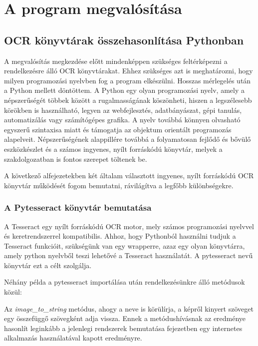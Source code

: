 \documentclass[12pt]{report}
\begin{document}
\chapter{A program megvalósítása}
\section{OCR könyvtárak összehasonlítása Pythonban}

A megvalósítás megkezdése előtt mindenképpen szükséges feltérképezni a rendelkezésre álló OCR könyvtárakat. Ehhez szükséges azt is meghatározni, hogy milyen programozási nyelvben fog a program elkészülni. Hosszas mérlegelés után a Python mellett döntöttem. A Python egy olyan programozási nyelv, amely a népszerűségét többek között a rugalmasságának köszönheti, hiszen a legszélesebb körökben is használható, legyen az webfejlesztés, adatbányászat, gépi tanulás, automatizálás vagy számítógépes grafika. A nyelv továbbá könnyen olvasható egyszerű szintaxisa miatt és támogatja az objektum orientált programozás alapelveit. Népszerűségének alappillére továbbá a folyamatosan fejlődő és bővülő eszközkészlet és a számos ingyenes, nyílt forráskódú könyvtár, melyek a szakdolgozatban is fontos szerepet töltenek be.

A következő alfejezetekben két általam választott ingyenes, nyílt forráskódú OCR könyvtár működését fogom bemutatni, rávilágítva a legfőbb különbségekre.

\subsection{A Pytesseract könyvtár bemutatása}

A Tesseract egy nyílt forráskódú OCR motor, mely számos programozási nyelvvel és keretrendszerrel kompatibilis.
Ahhoz, hogy Pythonból használni tudjuk a Tesseract funkcióit, szükségünk van egy wrapperre, azaz egy olyan könyvtárra, amely python nyelvből teszi lehetővé a Tesseract használatát. A pytesseract nevű könyvtár ezt a célt szolgálja.

\pagebreak

Néhány példa a pytesseract importálása után rendelkezésünkre álló metódusok közül:

Az \textit{image\_to\_string} metódus, ahogy a neve is körülírja, a képről kinyert szöveget egy összefüggő szövegként adja vissza. Ennek a metódushívásnak az eredménye hasonlít leginkább a jelenlegi rendszerek bemutatása fejezetben egy internetes alkalmazás használatával kapott eredményre.
\end{document}

